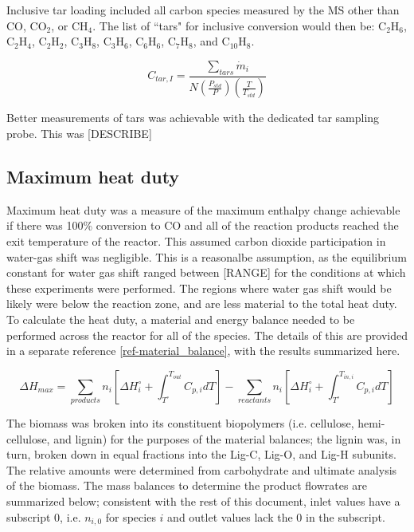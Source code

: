 \documentclass[11pt,twocolumn]{article}
\begin{document}
Inclusive tar loading included all carbon species measured by the MS other than CO, CO$_2$, or CH$_4$.  The list of ``tars" for inclusive conversion would then be: C$_2$H$_6$, C$_2$H$_4$, C$_2$H$_2$, C$_3$H$_8$, C$_3$H$_6$, C$_6$H$_6$, C$_7$H$_8$, and C$_{10}$H$_8$.

\begin{equation}
	C_{tar,I} = \frac{\sum_{tars}\dot{m}_{i}}{N\left(\frac{P_{std}}{P}\right)\left(\frac{T}{T_{std}}\right)}
\end{equation}

Better measurements of tars was achievable with the dedicated tar sampling probe.  This was [DESCRIBE]

\subsection*{Maximum heat duty}
Maximum heat duty was a measure of the maximum enthalpy change achievable if there was 100\% conversion to CO and all of the reaction products reached the exit temperature of the reactor.  This assumed carbon dioxide participation in water-gas shift was negligible.  This is a reasonalbe assumption, as the equilibrium constant for water gas shift ranged between [RANGE] for the conditions at which these experiments were performed.  The regions where water gas shift would be likely were below the reaction zone, and are less material to the total heat duty.  To calculate the heat duty, a material and energy balance needed to be performed across the reactor for all of the species.  The details of this are provided in a separate reference \ref{ref-material_balance}, with the results summarized here.

\begin{dmath}
	\Delta H_{max} = \sum_{products}n_{i}\left[\Delta H_{i}^{\circ}+\int_{T^{\circ}}^{T_{out}}C_{p,i}dT\right] -   \sum_{reactants}n_{i}\left[\Delta H_{i}^{\circ}+\int_{T^{\circ}}^{T_{in,i}}C_{p,i}dT\right]
\end{dmath} 

The biomass was broken into its constituent biopolymers (i.e. cellulose, hemi-cellulose, and lignin) for the purposes of the material balances; the lignin was, in turn, broken down in equal fractions into the Lig-C, Lig-O, and Lig-H subunits.  The relative amounts were determined from carbohydrate and ultimate analysis of the biomass.  The mass balances to determine the product flowrates are summarized below; consistent with the rest of this document, inlet values have a subscript $0$, i.e. $n_{i,0}$ for species $i$ and outlet values lack the $0$ in the subscript.
\end{document}

